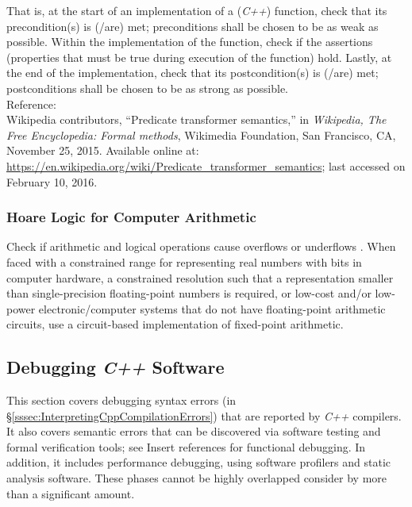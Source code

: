 	That is, at the start of an implementation of a ({\it C++}) function, check that its precondition(s) is (/are) met; preconditions shall be chosen to be as weak as possible. Within the implementation of the function, check if the assertions (properties that must be true during execution of the function) hold. Lastly, at the end of the implementation, check that its postcondition(s) is (/are) met; postconditions shall be chosen to be as strong as possible. \\

Reference: \\
Wikipedia contributors, ``Predicate transformer semantics,'' in {\it Wikipedia, The Free Encyclopedia: Formal methods}, Wikimedia Foundation, San Francisco, CA, November 25, 2015. Available online at: \url{https://en.wikipedia.org/wiki/Predicate_transformer_semantics}; last accessed on February 10, 2016.



\subsubsection{Hoare Logic for Computer Arithmetic}
\label{sssec:HoareLogicForComputerArithmetic}

	Check if arithmetic and logical operations cause overflows or underflows \cite{Crowl2015,Crowl2012}. When faced with a constrained range for representing real numbers with bits in computer hardware, a constrained resolution such that a representation smaller than single-precision floating-point numbers is required, or low-cost and/or low-power electronic/computer systems that do not have floating-point arithmetic circuits, use a circuit-based implementation of fixed-point arithmetic.



\subsection{Debugging {\it C++} Software}
\label{ssec:DebuggingCppSoftware}

	This section covers debugging syntax errors (in \S\ref{sssec:InterpretingCppCompilationErrors}) that are reported by {\it C++} compilers. It also covers semantic errors that can be discovered via software testing and formal verification tools; see {\Huge Insert references for functional debugging}. In addition, it includes performance debugging, using software profilers and static analysis software. These phases cannot be highly overlapped consider by more than a significant amount.
\ \\

